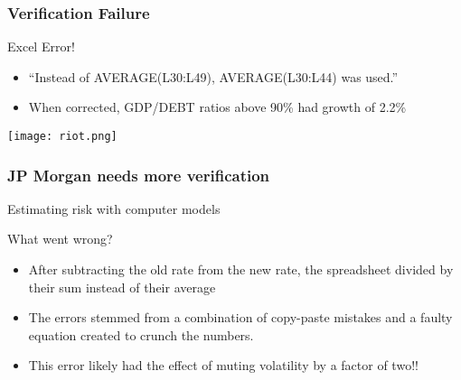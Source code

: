 \documentclass[mathserif]{beamer}
\begin{document}
\begin{frame}
  \frametitle{Verification Failure}
  \begin{block}{Excel Error!}
    \begin{itemize}
     \item ``Instead of AVERAGE(L30:L49), AVERAGE(L30:L44) was used.''
     \item When corrected, GDP/DEBT ratios above 90\% had growth of 2.2\%
    \end{itemize}
  \end{block}

 \begin{center}
  \center
  \texttt{[image: riot.png]}\\
 \end{center}
 
\end{frame}

\begin{frame}
  \frametitle{JP Morgan needs more verification}
  \begin{block}{Estimating risk with computer models}
  \end{block}

  \begin{block}{What went wrong?}
    \begin{itemize}
     \item After subtracting the old rate from the new rate, the spreadsheet divided by their sum instead of their average
     \item The errors stemmed from a combination of copy-paste mistakes and a faulty equation created to crunch the numbers.
     \item This error likely had the effect of muting volatility by a factor of two!!
    \end{itemize}
  \end{block}
 
\end{frame}
\end{document}
